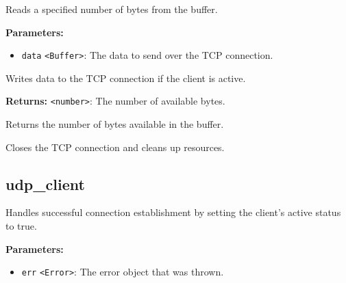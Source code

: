 \documentclass[12pt,a4paper]{article}
\begin{document}
\noindent Reads a specified number of bytes from the buffer.

\vspace{5mm}
\noindent {}


\noindent \textbf{Parameters:}
\begin{itemize}
  \item \texttt{data} \texttt{<Buffer>}: The data to send over the TCP connection.
\end{itemize}

\noindent Writes data to the TCP connection if the client is active.

\vspace{5mm}
\noindent {}


\noindent \textbf{Returns:} \texttt{<number>}: The number of available bytes.

\noindent Returns the number of bytes available in the buffer.

\vspace{5mm}
\noindent {}


\noindent Closes the TCP connection and cleans up resources.


\subsection{udp\_client}
\vspace{5mm}
\noindent {}


\noindent Handles successful connection establishment by setting the client's active status to true.

\vspace{5mm}
\noindent {}


\noindent \textbf{Parameters:}
\begin{itemize}
  \item \texttt{err} \texttt{<Error>}: The error object that was thrown.
\end{itemize}
\end{document}
